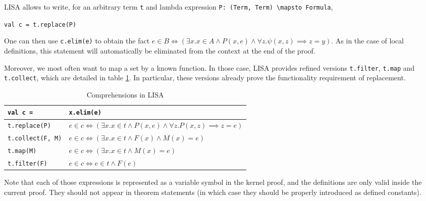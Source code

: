 LISA allows to write, for an arbitrary term \lstinline|t| and lambda expression \lstinline|P: (Term, Term) \mapsto Formula|,
\begin{center}
  \lstinline|val c = t.replace(P)|
\end{center}
One can then use \lstinline|c.elim(e)| to obtain the fact 
$e \in B \iff (\exists x. x \in A \land P(x, e) \land \forall z. \psi(x, z) \implies z = y)$. As in the case of local definitions, this statement will automatically be eliminated from the context at the end of the proof.

Moreover, we most often want to map a set by a known function. In those case, LISA provides refined versions \lstinline|t.filter|, \lstinline|t.map| and \lstinline|t.collect|, which are detailed in table \ref{tab:comprehensions}. In particular, these versions already prove the functionality requirement of replacement.
\begin{table}[h]
  \begin{tabular}{l|l}
    \textbf{\lstinline|val c = |} & \textbf{\lstinline|x.elim(e)|} \\ \hline
    \lstinline|t.replace(P)| & $e \in c \iff (\exists x. x \in t \land P(x, e) \land ∀ z. P(x, z) \implies z = e)$ \\
    \lstinline|t.collect(F, M)| & $e \in c \iff (\exists x. x \in t \land F(x) \land M(x) = e)$ \\
    \lstinline|t.map(M)| & $e \in c \iff (\exists x. x \in t \land M(x) = e)$ \\
    \lstinline|t.filter(F)| & $e \in c \iff e \in t \land F(e)$ \\   
  \end{tabular}
  \caption{Comprehensions in LISA}
  \label{tab:comprehensions}
\end{table}

Note that each of those expressions is represented as a variable symbol in the kernel proof, and the definitions are only valid inside the current proof. They should not appear in theorem statements (in which case they should be properly introduced as defined constants).